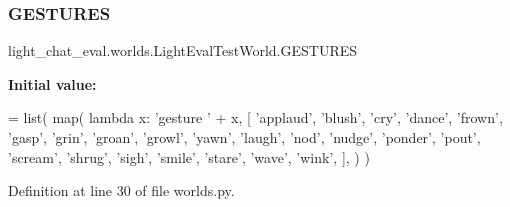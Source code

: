 \mbox{\label{classlight__chat__eval_1_1worlds_1_1LightEvalTestWorld_aa52cfc2c62b730cf0240a26dacfe14e9}} 
\subsubsection{\texorpdfstring{G\+E\+S\+T\+U\+R\+ES}{GESTURES}}
{\footnotesize\ttfamily light\+\_\+chat\+\_\+eval.\+worlds.\+Light\+Eval\+Test\+World.\+G\+E\+S\+T\+U\+R\+ES\hspace{0.3cm}{\ttfamily [static]}}

{\bfseries Initial value\+:}
\begin{DoxyCode}
=  list(
        map(
            \textcolor{keyword}{lambda} x: \textcolor{stringliteral}{'gesture '} + x,
            [
                \textcolor{stringliteral}{'applaud'},
                \textcolor{stringliteral}{'blush'},
                \textcolor{stringliteral}{'cry'},
                \textcolor{stringliteral}{'dance'},
                \textcolor{stringliteral}{'frown'},
                \textcolor{stringliteral}{'gasp'},
                \textcolor{stringliteral}{'grin'},
                \textcolor{stringliteral}{'groan'},
                \textcolor{stringliteral}{'growl'},
                \textcolor{stringliteral}{'yawn'},
                \textcolor{stringliteral}{'laugh'},
                \textcolor{stringliteral}{'nod'},
                \textcolor{stringliteral}{'nudge'},
                \textcolor{stringliteral}{'ponder'},
                \textcolor{stringliteral}{'pout'},
                \textcolor{stringliteral}{'scream'},
                \textcolor{stringliteral}{'shrug'},
                \textcolor{stringliteral}{'sigh'},
                \textcolor{stringliteral}{'smile'},
                \textcolor{stringliteral}{'stare'},
                \textcolor{stringliteral}{'wave'},
                \textcolor{stringliteral}{'wink'},
            ],
        )
    )
\end{DoxyCode}


Definition at line 30 of file worlds.\+py.



